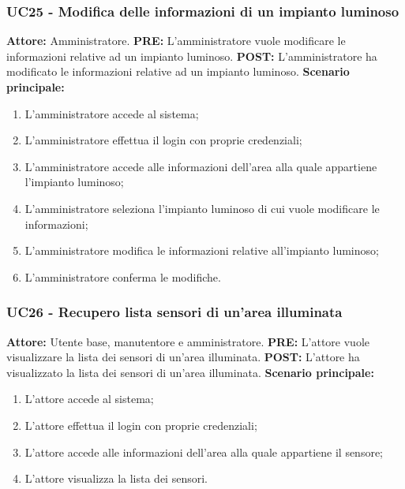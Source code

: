\documentclass[a4paper, 12pt]{article}
\begin{document}
\subsubsection{UC25 - Modifica delle informazioni di un impianto luminoso}
\textbf{Attore: } Amministratore.\newline
\textbf{PRE: } L'amministratore vuole modificare le informazioni relative ad un impianto luminoso.\newline
\textbf{POST: } L'amministratore ha modificato le informazioni relative ad un impianto luminoso.\newline
\textbf{Scenario principale: }
\begin{enumerate}
    \item L'amministratore accede al sistema;
    \item L'amministratore effettua il login con proprie credenziali;
    \item L'amministratore accede alle informazioni dell'area alla quale appartiene l'impianto luminoso;
    \item L'amministratore seleziona l'impianto luminoso di cui vuole modificare le informazioni;
    \item L'amministratore modifica le informazioni relative all'impianto luminoso;
    \item L'amministratore conferma le modifiche.
\end{enumerate}

\subsubsection{UC26 - Recupero lista sensori di un'area illuminata}
\textbf{Attore: } Utente base, manutentore e amministratore.\newline
\textbf{PRE: } L'attore vuole visualizzare la lista dei sensori di un'area illuminata.\newline
\textbf{POST: } L'attore ha visualizzato la lista dei sensori di un'area illuminata.\newline
\textbf{Scenario principale: }
\begin{enumerate}
    \item L'attore accede al sistema;
    \item L'attore effettua il login con proprie credenziali;
    \item L'attore accede alle informazioni dell'area alla quale appartiene il sensore;
    \item L'attore visualizza la lista dei sensori.
\end{enumerate}
\end{document}
